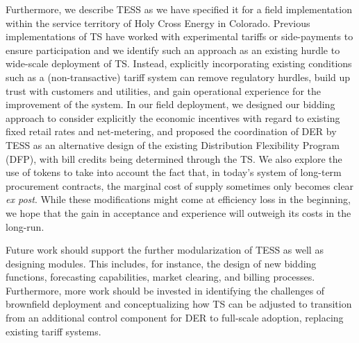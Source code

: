 \documentclass[12pt]{article}{Definitions/mdpi}
\begin{document}
Furthermore, we describe TESS as we have specified it for a field implementation within the service territory of Holy Cross Energy in Colorado.
Previous implementations of TS have worked with experimental tariffs or side-payments to ensure participation and we identify such an approach as an existing hurdle to wide-scale deployment of TS. 
Instead, explicitly incorporating existing conditions such as a (non-transactive) tariff system can remove regulatory hurdles, build up trust with customers and utilities, and gain operational experience for the improvement of the system. 
In our field deployment, we designed our bidding approach to consider explicitly the economic incentives with regard to existing fixed retail rates and net-metering, and proposed the coordination of DER by TESS as an alternative design of the existing Distribution Flexibility Program (DFP), with bill credits being determined through the TS. 
We also explore the use of tokens to take into account the fact that, in today's system of long-term procurement contracts, the marginal cost of supply sometimes only becomes clear \textit{ex post}.
While these modifications might come at efficiency loss in the beginning, we hope that the gain in acceptance and experience will outweigh its costs in the long-run.

Future work should support the further modularization of TESS as well as designing modules. This includes, for instance, the design of new bidding functions, forecasting capabilities, market clearing, and billing processes.
Furthermore, more work should be invested in identifying the challenges of brownfield deployment and conceptualizing how TS can be adjusted to transition from an additional control component for DER to full-scale adoption, replacing existing tariff systems.


\pagebreak

\singlespacing
\newpage


\clearpage



\end{document}
